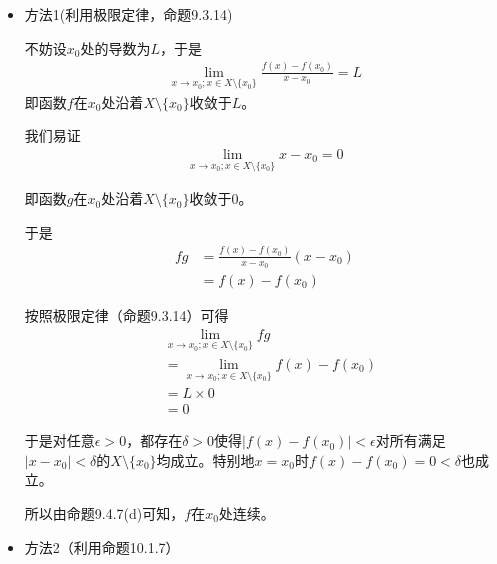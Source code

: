 \documentclass{article}
\begin{document}
\begin{itemize}
  \item 方法1(利用极限定律，命题9.3.14)

        不妨设$x_0$处的导数为$L$，于是
        \begin{align*}
          \lim\limits_{x \to x_0; x \in X \setminus \{x_0\}} \frac{f(x) - f(x_0)}{x - x_0} = L
        \end{align*}
        即函数$f$在$x_0$处沿着$X \setminus \{x_0\}$收敛于$L$。

        我们易证
        \begin{align*}
          \lim\limits_{x \to x_0; x \in X \setminus \{x_0\}} x - x_0 = 0
        \end{align*}

        即函数$g$在$x_0$处沿着$X \setminus \{x_0\}$收敛于$0$。

        于是
        \begin{align*}
          fg & = \frac{f(x) - f(x_0)}{x - x_0}  (x - x_0) \\
             & = f(x) - f(x_0)
        \end{align*}

        按照极限定律（命题9.3.14）可得
        \begin{align*}
           & \lim\limits_{x \to x_0; x \in X \setminus \{x_0\}} fg             \\
           & = \lim\limits_{x \to x_0; x \in X \setminus \{x_0\}} f(x) - f(x_0) \\
           & = L \times 0                                                      \\
           & = 0
        \end{align*}

        于是对任意$\epsilon > 0$，都存在$\delta > 0$使得$|f(x) - f(x_0)| < \epsilon$对所有满足
        $|x - x_0| < \delta$的$X \setminus \{x_0\}$均成立。特别地$x = x_0$时$f(x) - f(x_0) = 0 < \delta$也成立。

        所以由命题9.4.7(d)可知，$f$在$x_0$处连续。



  \item 方法2（利用命题10.1.7）


\end{itemize}
\end{document}
